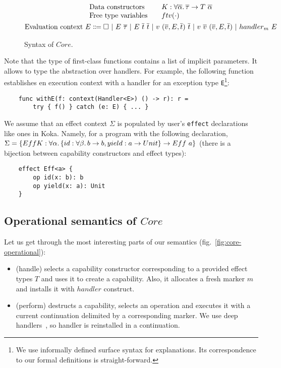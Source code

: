 \documentclass[acmsmall]{acmart}
\newcommand{\vor}{~|~}
\newcommand{\ap}{~}
\begin{document}
\begin{figure}
\begin{gather*}
\begin{array}{lrl}
            \text{Data constructors} & & K : \forall\overline{\alpha}\ldotp \overline{\tau}\to T\ap \overline{\alpha} \\
            \text{Free type variables} & & ftv(\cdot) \\
        \end{array}\\
        \begin{aligned}
            \text{Evaluation context } E \Coloneqq \square \vor E \ap \overline{\tau} \vor E \ap \overline{t}\ap \overline{t} \vor v \ap (\overline{v}, E, \overline{t}) \ap \overline{t} \vor v \ap \overline{v} \ap (\overline{v}, E, \overline{t}) \vor handler_m ~ E
        \end{aligned}\\
    \end{gather*}
    \caption{Syntax of $Core$.}
    \label{fig:core-syntax}
\end{figure}

Note that the type of first-class functions contains a list of implicit parameters.
It allows to type the abstraction over handlers.
For example, the following function establishes en execution context with a handler for an exception type \texttt{E}\footnote{We use informally defined surface syntax for explanations. Its correspondence to our formal definitions is straight-forward.}:
\begin{verbatim}
    func withE(f: context(Handler<E>) () -> r): r =
        try { f() } catch (e: E) { ... }
\end{verbatim}

We assume that an effect context $\Sigma$ is populated by user's \texttt{effect} declarations like ones in Koka. %
Namely, for a program with the following declaration, $\Sigma = \{EffK : \forall\alpha\ldotp\{id : \forall\beta\ldotp b\to b, yield : a \to Unit\} \to Eff\ap a\}$ (there is a bijection between capability constructors and effect types):
\begin{verbatim}
    effect Eff<a> {
        op id(x: b): b
        op yield(x: a): Unit
    }
\end{verbatim}

\subsection{Operational semantics of $Core$}

Let us get through the most interesting parts of our semantics (fig.\ \ref{fig:core-operational}):
\begin{itemize}
    \item (handle) selects a capability constructor corresponding to a provided effect types $T$ and uses it to create a capability.
    Also, it allocates a fresh marker $m$ and installs it with $handler$ construct.
    \item (perform) destructs a capability, selects an operation and executes it with a current continuation delimited by a corresponding marker.
    We use deep handlers~\cite{hillerstrom2018shallow}, so handler is reinstalled in a continuation.
\end{itemize}
\end{document}
